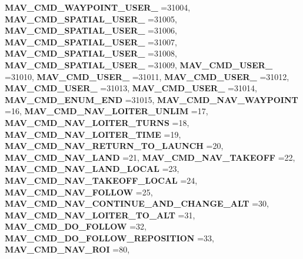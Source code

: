 \begin{DoxyCompactItemize}
\textbf{ M\+A\+V\+\_\+\+C\+M\+D\+\_\+\+W\+A\+Y\+P\+O\+I\+N\+T\+\_\+\+U\+S\+E\+R\+\_} =31004, 
\textbf{ M\+A\+V\+\_\+\+C\+M\+D\+\_\+\+S\+P\+A\+T\+I\+A\+L\+\_\+\+U\+S\+E\+R\+\_} =31005, 
\textbf{ M\+A\+V\+\_\+\+C\+M\+D\+\_\+\+S\+P\+A\+T\+I\+A\+L\+\_\+\+U\+S\+E\+R\+\_} =31006, 
\newline
\textbf{ M\+A\+V\+\_\+\+C\+M\+D\+\_\+\+S\+P\+A\+T\+I\+A\+L\+\_\+\+U\+S\+E\+R\+\_} =31007, 
\textbf{ M\+A\+V\+\_\+\+C\+M\+D\+\_\+\+S\+P\+A\+T\+I\+A\+L\+\_\+\+U\+S\+E\+R\+\_} =31008, 
\textbf{ M\+A\+V\+\_\+\+C\+M\+D\+\_\+\+S\+P\+A\+T\+I\+A\+L\+\_\+\+U\+S\+E\+R\+\_} =31009, 
\textbf{ M\+A\+V\+\_\+\+C\+M\+D\+\_\+\+U\+S\+E\+R\+\_} =31010, 
\newline
\textbf{ M\+A\+V\+\_\+\+C\+M\+D\+\_\+\+U\+S\+E\+R\+\_} =31011, 
\textbf{ M\+A\+V\+\_\+\+C\+M\+D\+\_\+\+U\+S\+E\+R\+\_} =31012, 
\textbf{ M\+A\+V\+\_\+\+C\+M\+D\+\_\+\+U\+S\+E\+R\+\_} =31013, 
\textbf{ M\+A\+V\+\_\+\+C\+M\+D\+\_\+\+U\+S\+E\+R\+\_} =31014, 
\newline
\textbf{ M\+A\+V\+\_\+\+C\+M\+D\+\_\+\+E\+N\+U\+M\+\_\+\+E\+ND} =31015, 
\textbf{ M\+A\+V\+\_\+\+C\+M\+D\+\_\+\+N\+A\+V\+\_\+\+W\+A\+Y\+P\+O\+I\+NT} =16, 
\textbf{ M\+A\+V\+\_\+\+C\+M\+D\+\_\+\+N\+A\+V\+\_\+\+L\+O\+I\+T\+E\+R\+\_\+\+U\+N\+L\+IM} =17, 
\textbf{ M\+A\+V\+\_\+\+C\+M\+D\+\_\+\+N\+A\+V\+\_\+\+L\+O\+I\+T\+E\+R\+\_\+\+T\+U\+R\+NS} =18, 
\newline
\textbf{ M\+A\+V\+\_\+\+C\+M\+D\+\_\+\+N\+A\+V\+\_\+\+L\+O\+I\+T\+E\+R\+\_\+\+T\+I\+ME} =19, 
\textbf{ M\+A\+V\+\_\+\+C\+M\+D\+\_\+\+N\+A\+V\+\_\+\+R\+E\+T\+U\+R\+N\+\_\+\+T\+O\+\_\+\+L\+A\+U\+N\+CH} =20, 
\textbf{ M\+A\+V\+\_\+\+C\+M\+D\+\_\+\+N\+A\+V\+\_\+\+L\+A\+ND} =21, 
\textbf{ M\+A\+V\+\_\+\+C\+M\+D\+\_\+\+N\+A\+V\+\_\+\+T\+A\+K\+E\+O\+FF} =22, 
\newline
\textbf{ M\+A\+V\+\_\+\+C\+M\+D\+\_\+\+N\+A\+V\+\_\+\+L\+A\+N\+D\+\_\+\+L\+O\+C\+AL} =23, 
\textbf{ M\+A\+V\+\_\+\+C\+M\+D\+\_\+\+N\+A\+V\+\_\+\+T\+A\+K\+E\+O\+F\+F\+\_\+\+L\+O\+C\+AL} =24, 
\textbf{ M\+A\+V\+\_\+\+C\+M\+D\+\_\+\+N\+A\+V\+\_\+\+F\+O\+L\+L\+OW} =25, 
\textbf{ M\+A\+V\+\_\+\+C\+M\+D\+\_\+\+N\+A\+V\+\_\+\+C\+O\+N\+T\+I\+N\+U\+E\+\_\+\+A\+N\+D\+\_\+\+C\+H\+A\+N\+G\+E\+\_\+\+A\+LT} =30, 
\newline
\textbf{ M\+A\+V\+\_\+\+C\+M\+D\+\_\+\+N\+A\+V\+\_\+\+L\+O\+I\+T\+E\+R\+\_\+\+T\+O\+\_\+\+A\+LT} =31, 
\textbf{ M\+A\+V\+\_\+\+C\+M\+D\+\_\+\+D\+O\+\_\+\+F\+O\+L\+L\+OW} =32, 
\textbf{ M\+A\+V\+\_\+\+C\+M\+D\+\_\+\+D\+O\+\_\+\+F\+O\+L\+L\+O\+W\+\_\+\+R\+E\+P\+O\+S\+I\+T\+I\+ON} =33, 
\textbf{ M\+A\+V\+\_\+\+C\+M\+D\+\_\+\+N\+A\+V\+\_\+\+R\+OI} =80, 

\end{DoxyCompactItemize}
